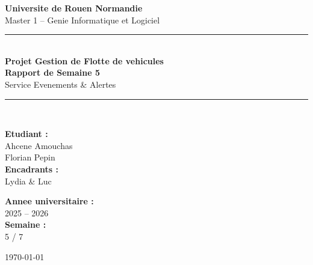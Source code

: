 \documentclass[12pt,a4paper]{article}
\begin{document}
\begin{titlepage}
  \centering
  \vspace*{1cm}

  {\Large\textbf{Universite de Rouen Normandie}\\[0.3cm]
  \large Master 1 -- Genie Informatique et Logiciel}

  \vspace{1.5cm}
  \rule{\linewidth}{0.5mm}\\[0.4cm]

  {\Huge\bfseries\color{primary} Projet Gestion de Flotte de vehicules\\[0.3cm]}
  {\LARGE\bfseries Rapport de Semaine 5}\\[0.3cm]
  {\large\color{darkgray} Service Evenements \& Alertes}

  \rule{\linewidth}{0.5mm}\\[1.5cm]

  \begin{minipage}{0.45\textwidth}
    \begin{flushleft}
      \textbf{Etudiant :}\\
      Ahcene Amouchas \\
      Florian Pepin \\[0.5cm]
      \textbf{Encadrants :}\\
      Lydia \& Luc
    \end{flushleft}
  \end{minipage}
  \hfill
  \begin{minipage}{0.45\textwidth}
    \begin{flushright}
      \textbf{Annee universitaire :}\\
      2025 -- 2026\\[0.5cm]
      \textbf{Semaine :}\\
      5 / 7
    \end{flushright}
  \end{minipage}

  \vfill
  {\large\today}
\end{titlepage}

\tableofcontents
\newpage

\end{document}
